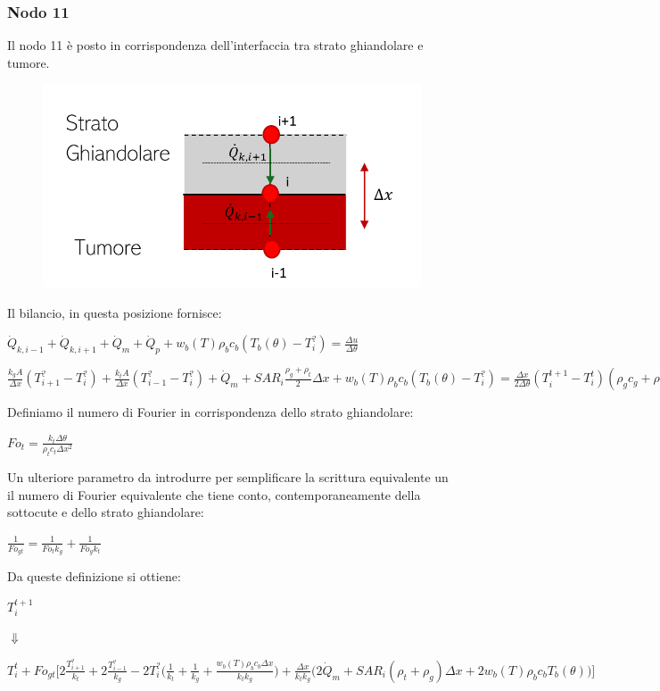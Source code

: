 \subsubsection*{Nodo 11}
Il nodo 11 è posto in corrispondenza dell'interfaccia tra strato ghiandolare e tumore.
\begin{figure}[H]
    \centering
    \includegraphics[width=.6\textwidth]{Immagini/Nodi/nodo10.png} 
    \label{nodo11}
\end{figure}
\noindent
Il bilancio, in questa posizione fornisce:
\begin{center}
	$ \Dot{Q} _{k, i-1} +\Dot{Q} _{k, i+1}+ \Dot{Q} _{m} +\Dot{Q} _{p}+ w_b (T) \rho _b c_b (T_b(\theta)-T_i ^?)= \frac{\Delta u}{\Delta \theta} $
\end{center}
\vspace{0.15cm}
\begin{center}
	$ \frac{k_{g} A }{\Delta x}(T_{i+1} ^? - T_i ^? ) + \frac{k_t A }{\Delta x}(T_{i-1} ^? - T_i ^? )+ \Dot{Q} _{m} + SAR_i \frac{\rho _{g} + \rho _t}{2} \Delta x + w_b (T) \rho _b c_b (T_b(\theta)-T_i ^?) = \frac{\Delta x}{ 2 \Delta \theta}(T_i ^{t+1} - T_i ^t ) (\rho _{g} c_{g} + \rho _{t} c_{t} )$
\end{center}
Definiamo il numero di Fourier in corrispondenza dello strato ghiandolare:
\begin{center}
	$Fo_{t}= \frac{k_{t} \Delta \theta}{\rho _{t} c_{t} \Delta x^2}$
\end{center}
Un ulteriore parametro da introdurre per semplificare la scrittura equivalente un il numero di Fourier equivalente che tiene conto, contemporaneamente della sottocute e dello strato ghiandolare:
\begin{center}
	$\frac{1}{Fo_{gt}}= \frac{1}{Fo_{t}k_g}+ \frac{1}{Fo_{g}k_{t}}$
\end{center}
Da queste definizione si ottiene:
\begin{center}
	$T_i ^{t+1} $
\end{center}
\begin{center}
	$\Downarrow$
\end{center}
\begin{center}
	$T_i ^t + Fo_{gt} \Bigg[ 2\frac{T_{i+1} ^?}{k_t} + 2\frac{T_{i-1} ^?}{k_{g}}- 2T_i ^? \Big(\frac{1}{k_t} + \frac{1}{k_{g}}+ \frac{ w_b (T) \rho _b c_b \Delta x }{k_{t}k_g} \Big) +  \frac{\Delta x }{k_{t}k_g} \Big(2\Dot{Q} _{m} +  SAR_i (\rho _{t}+ \rho _g) \Delta x + 2w_b (T) \rho _b c_b T_b(\theta)\Big) \Bigg]$
\end{center}


